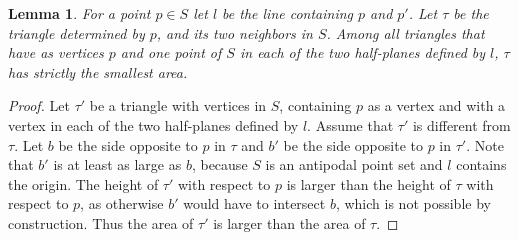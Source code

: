 \documentclass[twoside]{article}
\newtheorem{lem}[defin]{Lemma}
\begin{document}
\begin{lem}\label{1}
For a point $p ∈ S$ let $l$ be the line containing $p$ and $p'$. Let $τ$ be the triangle
determined by $p$, and its two neighbors in $S$. Among all triangles that have as vertices
$p$ and one point of $S$ in each of the two half-planes defined by $l$, $τ$ has strictly the
smallest area.
\end{lem}
\begin{proof}
Let $τ'$ be a triangle with vertices in $S$, containing $p$ as a vertex and with a vertex
in each of the two half-planes defined by $l$. Assume that $τ'$ is different from $τ$. Let
$b$ be the side opposite to $p$ in $τ$ and $b'$ be the side opposite to $p$ in $τ'$. Note that $b'$
is at least as large as $b$, because $S$ is an antipodal point set and $l$ contains the origin.
The height of $τ'$ with respect to $p$ is larger than the height of $τ$ with respect to $p$, as
otherwise $b'$ would have to intersect $b$, which is not possible by construction. Thus
the area of $τ'$ is larger than the area of $τ$.


\end{proof}
\end{document}
